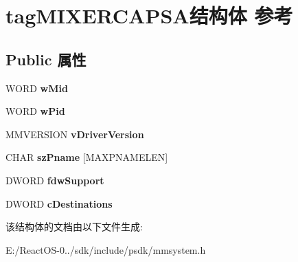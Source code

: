 \hypertarget{structtag_m_i_x_e_r_c_a_p_s_a}{}\section{tag\+M\+I\+X\+E\+R\+C\+A\+P\+S\+A结构体 参考}
\label{structtag_m_i_x_e_r_c_a_p_s_a}
\subsection*{Public 属性}
\begin{DoxyCompactItemize}
\item 
\mbox{\label{structtag_m_i_x_e_r_c_a_p_s_a_a8215eb5d5b7003b0cf2feeb9880c26c6}} 
W\+O\+RD {\bfseries w\+Mid}
\item 
\mbox{\label{structtag_m_i_x_e_r_c_a_p_s_a_a6368c0d8cb6c03c2a4826c434eb1a71d}} 
W\+O\+RD {\bfseries w\+Pid}
\item 
\mbox{\label{structtag_m_i_x_e_r_c_a_p_s_a_a73ba59758cf8dcc6e6dbf7db3ece37b6}} 
M\+M\+V\+E\+R\+S\+I\+ON {\bfseries v\+Driver\+Version}
\item 
\mbox{\label{structtag_m_i_x_e_r_c_a_p_s_a_a8f90818883fec0925ab502e97e09f315}} 
C\+H\+AR {\bfseries sz\+Pname} \mbox{[}M\+A\+X\+P\+N\+A\+M\+E\+L\+EN\mbox{]}
\item 
\mbox{\label{structtag_m_i_x_e_r_c_a_p_s_a_a6c119421cbf1b124250281b5d19eb38f}} 
D\+W\+O\+RD {\bfseries fdw\+Support}
\item 
\mbox{\label{structtag_m_i_x_e_r_c_a_p_s_a_a1a97cb406be3683f53005994aa40cc07}} 
D\+W\+O\+RD {\bfseries c\+Destinations}
\end{DoxyCompactItemize}


该结构体的文档由以下文件生成\+:\begin{DoxyCompactItemize}
\item 
E\+:/\+React\+O\+S-\/0../sdk/include/psdk/mmsystem.\+h\end{DoxyCompactItemize}
